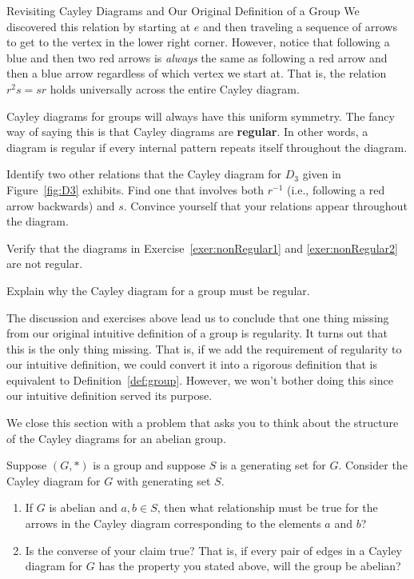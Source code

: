 \begin{section}{Revisiting Cayley Diagrams and Our Original Definition of a Group}
We discovered this relation by starting at $e$ and then traveling a sequence of arrows to get to the vertex in the lower right corner.  However, notice that following a blue and then two red arrows is \emph{always} the same as following a red arrow and then a blue arrow regardless of which vertex we start at.  That is, the relation $r^2s=sr$ holds universally across the entire Cayley diagram.

Cayley diagrams for groups will always have this uniform symmetry.  The fancy way of saying this is that Cayley diagrams are \textbf{regular}.  In other words, a diagram is regular if every internal pattern repeats itself throughout the diagram.

\begin{exercise}
Identify two other relations that the Cayley diagram for $D_3$ given in Figure~\ref{fig:D3} exhibits.  Find one that involves both $r^{-1}$ (i.e., following a red arrow backwards) and $s$.  Convince yourself that your relations appear throughout the diagram.
\end{exercise}

\begin{exercise}
Verify that the diagrams in Exercise~\ref{exer:nonRegular1} and \ref{exer:nonRegular2} are not regular.
\end{exercise}

\begin{problem}
Explain why the Cayley diagram for a group must be regular.
\end{problem}

The discussion and exercises above lead us to conclude that one thing missing from our original intuitive definition of a group is regularity.  It turns out that this is the only thing missing.  That is, if we add the requirement of regularity to our intuitive definition, we could convert it into a rigorous definition that is equivalent to Definition~\ref{def:group}.  However, we won't bother doing this since our intuitive definition served its purpose.

We close this section with a problem that asks you to think about the structure of the Cayley diagrams for an abelian group.

\begin{problem}
Suppose $(G,*)$ is a group and suppose $S$ is a generating set for $G$. Consider the Cayley diagram for $G$ with generating set $S$.
\begin{enumerate}[label=\rm{(\alph*)}]
\item If $G$ is abelian and $a,b\in S$, then what relationship must be true for the arrows in the Cayley diagram corresponding to the elements $a$ and $b$?
\item Is the converse of your claim true?  That is, if every pair of edges in a Cayley diagram for $G$ has the property you stated above, will the group be abelian?
\end{enumerate}
\end{problem}

\end{section}

